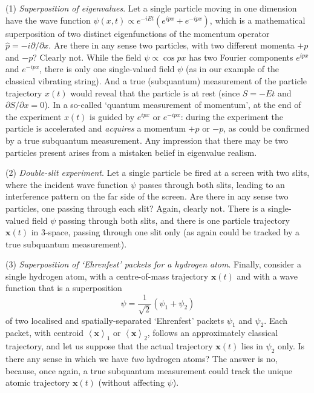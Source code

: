 \documentclass[12pt]{article}%
\begin{document}
(1) \textit{Superposition of eigenvalues}. Let a single particle moving in one
dimension have the wave function $\psi(x,t)\propto e^{-iEt}\left(
e^{ipx}+e^{-ipx}\right)  $, which is a mathematical superposition of two
distinct eigenfunctions of the momentum operator $\hat{p}=-i\partial/\partial
x$. Are there in any sense two particles, with two different momenta $+p$ and
$-p$? Clearly not. While the field $\psi\propto\cos px$ has two Fourier
components $e^{ipx}$ and $e^{-ipx}$, there is only one single-valued field
$\psi$ (as in our example of the classical vibrating string). And a true
(subquantum) measurement of the particle trajectory $x(t)$ would reveal that
the particle is at rest (since $S=-Et$ and $\partial S/\partial x=0$). In a
so-called `quantum measurement of momentum', at the end of the experiment
$x(t)$ is guided by $e^{ipx}$ or $e^{-ipx}$: during the experiment the
particle is accelerated and \textit{acquires} a momentum $+p$ or $-p$, as
could be confirmed by a true subquantum measurement. Any impression that there
may be two particles present arises from a mistaken belief in eigenvalue realism.

(2) \textit{Double-slit experiment}. Let a single particle be fired at a
screen with two slits, where the incident wave function $\psi$ passes through
both slits, leading to an interference pattern on the far side of the screen.
Are there in any sense two particles, one passing through each slit? Again,
clearly not. There is a single-valued field $\psi$ passing through both slits,
and there is one particle trajectory $\mathbf{x}(t)$ in 3-space, passing
through one slit only (as again could be tracked by a true subquantum measurement).

(3) \textit{Superposition of `Ehrenfest' packets for a hydrogen atom}.
Finally, consider a single hydrogen atom, with a centre-of-mass trajectory
$\mathbf{x}(t)$ and with a wave function that is a superposition%
\[
\psi=\frac{1}{\sqrt{2}}\left(  \psi_{1}+\psi_{2}\right)
\]
of two localised and spatially-separated `Ehrenfest' packets $\psi_{1}$ and
$\psi_{2}$. Each packet, with centroid $\left\langle \mathbf{x}\right\rangle
_{1}$ or $\left\langle \mathbf{x}\right\rangle _{2}$, follows an approximately
classical trajectory, and let us suppose that the actual trajectory
$\mathbf{x}(t)$ lies in $\psi_{2}$ only. Is there any sense in which we have
\textit{two} hydrogen atoms? The answer is no, because, once again, a true
subquantum measurement could track the unique atomic trajectory $\mathbf{x}%
(t)$ (without affecting $\psi$).
\end{document}
